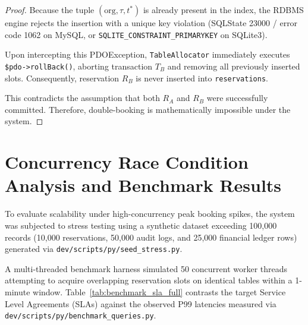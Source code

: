 \begin{proof}
Because the tuple $(\text{org}, \tau, t^*)$ is already present in the index, the RDBMS engine rejects the insertion with a unique key violation (SQLState 23000 / error code 1062 on MySQL, or \texttt{SQLITE\_CONSTRAINT\_PRIMARYKEY} on SQLite3).

Upon intercepting this PDOException, \texttt{TableAllocator} immediately executes \texttt{\$pdo->rollBack()}, aborting transaction $T_B$ and removing all previously inserted slots. Consequently, reservation $R_B$ is never inserted into \texttt{reservations}.

This contradicts the assumption that both $R_A$ and $R_B$ were successfully committed. Therefore, double-booking is mathematically impossible under the system.
\end{proof}

\section{Concurrency Race Condition Analysis and Benchmark Results}
\label{sec:test_concurrency_benchmarks}
To evaluate scalability under high-concurrency peak booking spikes, the system was subjected to stress testing using a synthetic dataset exceeding 100,000 records (10,000 reservations, 50,000 audit logs, and 25,000 financial ledger rows) generated via \texttt{dev/scripts/py/seed\_stress.py}.

A multi-threaded benchmark harness simulated 50 concurrent worker threads attempting to acquire overlapping reservation slots on identical tables within a 1-minute window. Table~\ref{tab:benchmark_sla_full} contrasts the target Service Level Agreements (SLAs) against the observed P99 latencies measured via \texttt{dev/scripts/py/benchmark\_queries.py}.

